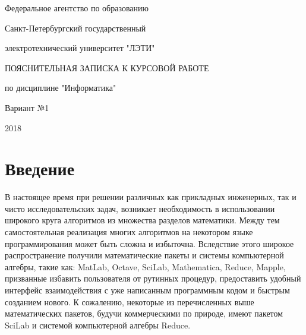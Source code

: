 \documentclass[russian,utf8,nocolumnxxxi,nocolumnxxxii]{eskdtext}
\begin{document}
\begin{center}

Федеральное агентство по образованию

Санкт-Петербургский государственный

электротехнический университет "ЛЭТИ"

\end{center}

\vspace{8em}

\begin{center}
ПОЯСНИТЕЛЬНАЯ ЗАПИСКА К КУРСОВОЙ РАБОТЕ

по дисциплине "Информатика"

\end{center}

\vspace{2.5em}

\begin{center}

Вариант №1

\end{center}


\vspace{20em}

\begin{center}

2018

\end{center}
\newpage

\tableofcontents

\newpage
\section{Введение}

В настоящее время при решении различных как прикладных инженерных, так и чисто исследовательских задач, возникает необходимость в использовании широкого круга алгоритмов из множества разделов математики. Между тем самостоятельная реализация многих алгоритмов на некотором языке программирования может быть сложна и избыточна. Вследствие этого широкое распространение получили математические пакеты и системы компьютерной алгебры, такие как: MatLab, Octave, SciLab, Mathematica, Reduce, Mapple, призванные избавить пользователя от рутинных процедур, предоставить удобный интерфейс взаимодействия с уже написанным программным кодом и быстрым созданием нового. К сожалению, некоторые из перечисленных выше математических пакетов, будучи коммерческими по природе, имеют пакетом SciLab и системой компьютерной алгебры Reduce.
\end{document}
